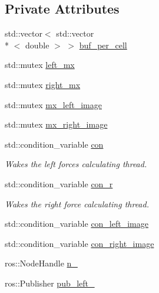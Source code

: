 \subsection*{Private Attributes}
\begin{DoxyCompactItemize}
\item 
std\-::vector$<$ std\-::vector\\*
$<$ double $>$ $>$ \hyperlink{class_d_e_c_o_m_p_r_e_s_s_e_r_a22a44231bf30be0dcc70e69997060229}{buf\-\_\-per\-\_\-cell}
\item 
std\-::mutex \hyperlink{class_d_e_c_o_m_p_r_e_s_s_e_r_a7651aa3b9e261f73663a72ae58e0a0d8}{left\-\_\-mx}
\item 
std\-::mutex \hyperlink{class_d_e_c_o_m_p_r_e_s_s_e_r_a460f81e181d9cf6bd3e231ccb214ee85}{right\-\_\-mx}
\item 
std\-::mutex \hyperlink{class_d_e_c_o_m_p_r_e_s_s_e_r_ad02e30134a049358562bbbdbf3fe9431}{mx\-\_\-left\-\_\-image}
\item 
std\-::mutex \hyperlink{class_d_e_c_o_m_p_r_e_s_s_e_r_afb694b6685eb9defa4f7b74b532dfe1f}{mx\-\_\-right\-\_\-image}
\item 
std\-::condition\-\_\-variable \hyperlink{class_d_e_c_o_m_p_r_e_s_s_e_r_af32f59832855fe170d0648df9a796ab7}{con}
\begin{DoxyCompactList}\small\item\em Wakes the left forces calculating thread. \end{DoxyCompactList}\item 
std\-::condition\-\_\-variable \hyperlink{class_d_e_c_o_m_p_r_e_s_s_e_r_a04c8c6987f5a9d3b1a8be8d79f1e4ead}{con\-\_\-r}
\begin{DoxyCompactList}\small\item\em Wakes the right force calculating thread. \end{DoxyCompactList}\item 
std\-::condition\-\_\-variable \hyperlink{class_d_e_c_o_m_p_r_e_s_s_e_r_a2c0c696518b5fabce9e67bad1ba0575b}{con\-\_\-left\-\_\-image}
\item 
std\-::condition\-\_\-variable \hyperlink{class_d_e_c_o_m_p_r_e_s_s_e_r_a291f014d7ab2626b04f707e7dc2f1b10}{con\-\_\-right\-\_\-image}
\item 
ros\-::\-Node\-Handle \hyperlink{class_d_e_c_o_m_p_r_e_s_s_e_r_a8ed70fff7c216f20ff25facd0fbfeaf6}{n\-\_\-}
\item 
ros\-::\-Publisher \hyperlink{class_d_e_c_o_m_p_r_e_s_s_e_r_a766c3bb649e0c98548415ed19c229207}{pub\-\_\-left\-\_\-}
\item 

\end{DoxyCompactItemize}

